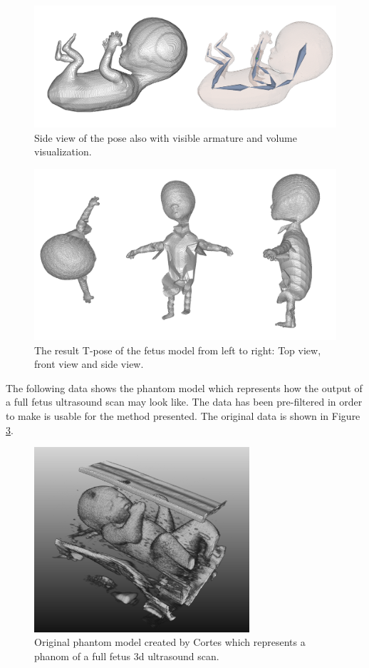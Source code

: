 \begin{figure} [htb!]
    \centering
	\includegraphics[width=14cm]{content/images/results/fetusModelSide.png}
	\caption{Side view of the pose also with visible armature and volume visualization.}
	\label{fig:}
\end{figure}
\begin{figure} [htb!]
    \centering
	\includegraphics[width=14cm]{content/images/results/fetusModelResult.png}
	\caption{The result T-pose of the fetus model from left to right: Top view, front view and side view.}
	\label{fig:}
\end{figure}
\newpage

The following data shows the phantom model which represents how the output of a full fetus ultrasound scan may look like. The data has been pre-filtered in order to make is usable for the method presented. The original data is shown in Figure \ref{fig:phantomFetusOriginalData}.

\begin{figure} [htb!]
    \centering
	\includegraphics[width=8cm]{content/images/phantomFetusOr.PNG}
	\caption{Original phantom model created by Cortes \cite{Cortes2016UltrasoundEvaluation} which represents a phanom of a full fetus \gls{3d} ultrasound scan.}
	\label{fig:phantomFetusOriginalData}
\end{figure}


